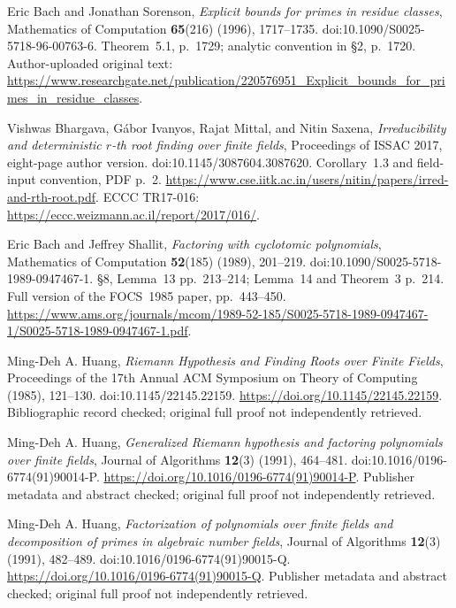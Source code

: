 Eric Bach and Jonathan Sorenson, \emph{Explicit bounds for primes in
residue classes}, Mathematics of Computation \textbf{65}(216)
(1996), 1717--1735. doi:10.1090/S0025-5718-96-00763-6.
Theorem~5.1, p.~1729; analytic convention in \S2, p.~1720.
Author-uploaded original text:
\url{https://www.researchgate.net/publication/220576951_Explicit_bounds_for_primes_in_residue_classes}.

Vishwas Bhargava, G\'abor Ivanyos, Rajat Mittal, and Nitin Saxena,
\emph{Irreducibility and deterministic $r$-th root finding over finite
fields}, Proceedings of ISSAC 2017, eight-page author version.
doi:10.1145/3087604.3087620.
Corollary~1.3 and field-input convention, PDF p.~2.
\url{https://www.cse.iitk.ac.in/users/nitin/papers/irred-and-rth-root.pdf}.
ECCC TR17-016: \url{https://eccc.weizmann.ac.il/report/2017/016/}.


Eric Bach and Jeffrey Shallit, \emph{Factoring with cyclotomic polynomials},
Mathematics of Computation \textbf{52}(185) (1989), 201--219.
doi:10.1090/S0025-5718-1989-0947467-1.
\S8, Lemma~13 pp.~213--214; Lemma~14 and Theorem~3 p.~214.
Full version of the FOCS~1985 paper, pp.~443--450.
\url{https://www.ams.org/journals/mcom/1989-52-185/S0025-5718-1989-0947467-1/S0025-5718-1989-0947467-1.pdf}.

Ming-Deh A. Huang, \emph{Riemann Hypothesis and Finding Roots over Finite Fields},
Proceedings of the 17th Annual ACM Symposium on Theory of Computing
(1985), 121--130. doi:10.1145/22145.22159.
\url{https://doi.org/10.1145/22145.22159}.
Bibliographic record checked; original full proof not independently retrieved.

Ming-Deh A. Huang, \emph{Generalized Riemann hypothesis and factoring
polynomials over finite fields}, Journal of Algorithms \textbf{12}(3)
(1991), 464--481. doi:10.1016/0196-6774(91)90014-P.
\url{https://doi.org/10.1016/0196-6774(91)90014-P}.
Publisher metadata and abstract checked; original full proof not independently retrieved.

Ming-Deh A. Huang, \emph{Factorization of polynomials over finite fields
and decomposition of primes in algebraic number fields}, Journal of
Algorithms \textbf{12}(3) (1991), 482--489.
doi:10.1016/0196-6774(91)90015-Q.
\url{https://doi.org/10.1016/0196-6774(91)90015-Q}.
Publisher metadata and abstract checked; original full proof not independently retrieved.
